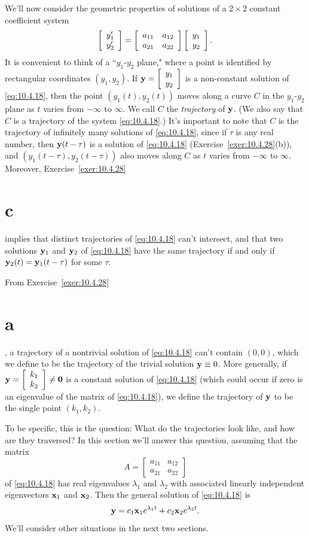 \noindent
We'll now consider the geometric properties of solutions of a $2\times2$ constant coefficient system
\begin{equation}
  \label{eq:10.4.18}\left[\begin{array}{l}y_{1}'\\y_{2}'\end{array}\right]=\left[
  \begin{array}{cc}
    a_{11} & a_{12} \\
    a_{21} & a_{22}
  \end{array}\right]\left[\begin{array}{l}y_{1}\\y_{2}\end{array}\right].
\end{equation}
It is convenient to think of a ``$y_{1}$-$y_{2}$ plane," where a point is identified by rectangular
coordinates $(y_{1},y_{2})$. If ${\bf y}=\displaystyle{\left[\begin{array}{l}y_{1}\\y_{2}\end{array}\right]}$ is a non-constant solution of
\eqref{eq:10.4.18}, then the point $(y_{1}(t),y_{2}(t))$ moves along a curve $C$ in the
$y_{1}$-$y_{2}$ plane as $t$ varies from $-\infty$ to $\infty$. We call $C$ the {\color{blue}\it
trajectory\/} of ${\bf y}$. (We also say that $C$ is a trajectory of the system \eqref{eq:10.4.18}.)
It's important to note that $C$ is the trajectory of infinitely many solutions of \eqref{eq:10.4.18},
since if $\tau$ is any real number, then ${\bf y}(t-\tau)$ is a solution of \eqref{eq:10.4.18}
(Exercise~\ref{exer:10.4.28}(b)), and $(y_{1}(t-\tau),y_{2}(t-\tau))$ also moves along $C$ as $t$
varies from $-\infty$ to $\infty$. Moreover, Exercise~\ref{exer:10.4.28}\part{c} implies that
distinct trajectories of \eqref{eq:10.4.18} can't intersect, and that two solutions ${\bf y}_{1}$
and ${\bf y}_{2}$ of \eqref{eq:10.4.18} have the same trajectory if and only if
${\bf y}_{2}(t)={\bf y}_{1}(t-\tau)$ for some $\tau$.

From Exercise~\ref{exer:10.4.28}\part{a}, a trajectory of a nontrivial solution of
\eqref{eq:10.4.18} can't contain $(0,0)$, which we define to be the trajectory of the trivial
solution ${\bf y}\equiv0$. More generally, if ${\bf y}=\displaystyle{\left[\begin{array}{l}k_{1}\\k_{2}\end{array}\right]}\ne{\bf0}$ is a
constant solution of \eqref{eq:10.4.18} (which could occur if zero is an eigenvalue of the matrix of
\eqref{eq:10.4.18}), we define the trajectory of ${\bf y}$ to be the single point $(k_{1},k_{2})$.

To be specific, this is the question: What do the trajectories look like, and how are they
traversed? In this section we'll answer this question, assuming that the matrix
\[
  A=\left[
  \begin{array}{cc}
    a_{11} & a_{12} \\
    a_{21} & a_{22}
  \end{array}\right]
\]
of \eqref{eq:10.4.18} has real eigenvalues $\lambda_{1}$ and $\lambda_{2}$ with associated linearly
independent eigenvectors ${\bf x}_{1}$ and ${\bf x}_{2}$. Then the general solution of
\eqref{eq:10.4.18} is
\begin{equation}
  \label{eq:10.4.19}{\bf y}=c_{1}{\bf x}_{1}e^{\lambda_{1}t}+c_{2}{\bf x}_{2}e^{\lambda_{2}t}.
\end{equation}
We'll consider other situations in the next two sections.

